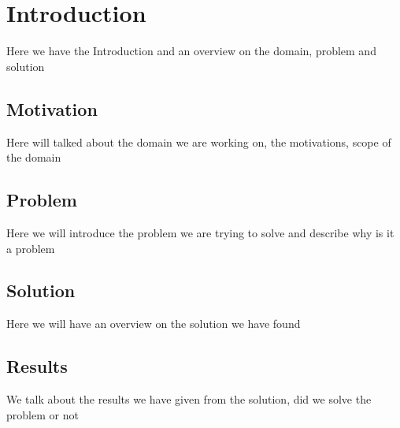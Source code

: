 \chapter{Introduction}
Here we have the Introduction and an overview on the domain, problem and solution

\section{Motivation}
Here will talked about the domain we are working on, the motivations, scope of the domain

\section{Problem}
Here we will introduce the problem we are trying to solve and describe why is it a problem

\section{Solution}
Here we will have an overview on the solution we have found

\section{Results}
We talk about the results we have given from the solution, did we solve the problem or not